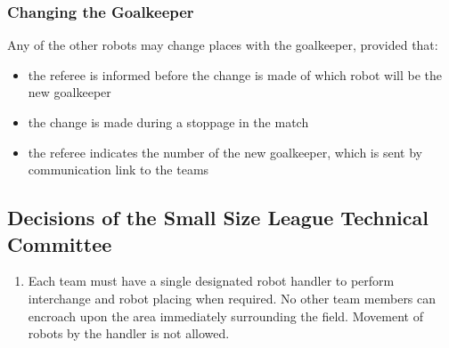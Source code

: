 \subsubsection{Changing the Goalkeeper}
Any of the other robots may change places with the goalkeeper, provided that:
\begin{itemize}
\item the referee is informed before the change is made of which robot will be the new goalkeeper
\item the change is made during a stoppage in the match
\item the referee indicates the number of the new goalkeeper, which is sent by communication link to the teams
\end{itemize}

\subsection*{Decisions of the Small Size League Technical Committee}
\begin{enumerate}
\item
Each team must have a single designated robot handler to perform interchange and robot placing when required.
No other team members can encroach upon the area immediately surrounding the field.
Movement of robots by the handler is not allowed.
\end{enumerate}
